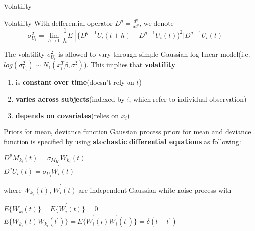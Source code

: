 \documentclass[10pt]{beamer}
\def\dev{U_i(t)}
\def\vol{\sigma_{U_i}^2}
\begin{document}
\begin{frame}[t]{Volatility}
\vspace{4pt}
\begin{block}{Volatility}
\vspace{0.5em}
With defferential operator $D^q=\displaystyle\frac{d^q}{dt^q}$, we denote\\
$$\vol=\lim\limits_{h \to 0}\displaystyle\frac{1}{h}E[\{D^{q-1}U_i(t+h)-D^{q-1}\dev\}^2|D^{q-1}\dev]$$
\vspace{0.5em}
\end{block}
The volatility $\vol$ is allowed to vary through simple Gaussian log linear model(i.e. $log(\vol)\sim N_1(x_{i}^{T}\beta,\sigma^2)$). This implies that \textbf{volatility}
\begin{enumerate}
\item is \textbf{constant over time}(doesn't rely on $t$)
\item \textbf{varies across subjects}(indexed by $i$, which refer to individual observation)
\item \textbf{depends on covariates}(relies on $x_i$)
\end{enumerate}
\end{frame}


\begin{frame}[t]{Priors for mean, deviance function}
\vspace{4pt}
Gaussian process priors for mean and deviance function is specified by using \textbf{stochastic differential equations} as following:
\begin{center}
    $D^pM_{k_i}(t)=\sigma_{M_{K_i}}\dot{W}_{k_i}(t)$\\
    $D^qU_i(t)=\sigma_{U_i}\dot{W}_{i}^{'}(t)$
\end{center}
where $\dot{W}_{k_i}(t)$, $\dot{W}_{i}^{'}(t)$ are independent Gaussian white noise process with
\begin{center}
    $E\{\dot{W}_{k_i}(t)\}=E\{\dot{W}_{i}^{'}(t)\}=0$\\
    $E\{\dot{W}_{k_i}(t)\dot{W}_{k_i}(t^{'})\}=E\{\dot{W}_{i}^{'}(t)\dot{W}_{i}^{'}(t^{'})\}=\delta(t-t^{'})$
\end{center}
\end{frame}
\end{document}

